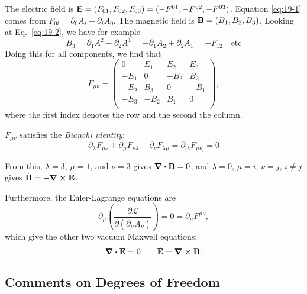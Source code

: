 The electric field is $\vb{E} = (F_{01}, F_{02}, F_{03}) = (-F^{01}, - F^{02}, -F^{03})$. Equation \eqref{eq:19-1} comes from $F_{0i} = \partial_0 A_{i} - \partial_{i} A_0$.
The magnetic field is $\vb{B} = (B_1, B_2, B_3)$. Looking at Eq.~\eqref{eq:19-2}, we have for example 
\begin{equation}
  B_3 = \partial_1 A^2 - \partial_2 A^1 = -\partial_1 A_2 + \partial_2 A_1 = -F_{12} \quad \text{etc}
\end{equation}
Doing this for all components, we find that
\begin{equation}
  F_{\mu\nu} = 
  \begin{pmatrix}
   0 & E_1 & E_2 & E_3 \\
   -E_1 & 0 & -B_3 & B_2 \\
   -E_2 & B_3 & 0 & -B_1 \\
   -E_3 & -B_2 & B_1 & 0 \\
  \end{pmatrix},
\end{equation}
where the first index denotes the row and the second the column.

\begin{claim}
  $F_{\mu\nu}$ satisfies the \emph{Bianchi identity}:
  \begin{equation}
    \partial_{\lambda} F_{\mu\nu} + \partial_{\mu} F_{\nu\lambda} + \partial_{\nu} F_{\lambda\mu} = \partial_{[\lambda} F_{\mu\nu]} = 0
  \end{equation}
\end{claim}
From this, $\lambda = 3$, $\mu = 1$, and $\nu = 3$ gives $\div \vb{B} = 0$, and $\lambda = 0$, $\mu = i$, $\nu = j$, $i \neq j$ gives $\dot{\vb{B}} = -\curl \vb{E}$.

Furthermore, the Euler-Lagrange equations are 
\begin{equation}
  \partial_{\mu} \left( \frac{\partial \mathcal{L}}{\partial (\partial_{\mu} A_{\nu})} \right) = 0 = \partial_{\mu} F^{\mu\nu},
\end{equation}
which give the other two vacuum Maxwell equations: 
\begin{equation}
  \div \vb{E} = 0 \qquad \dot{\vb{E}} = \curl \vb{B}.
\end{equation}

\subsection{Comments on Degrees of Freedom}%
\label{sub:comments_on_degrees_of_freedom}

